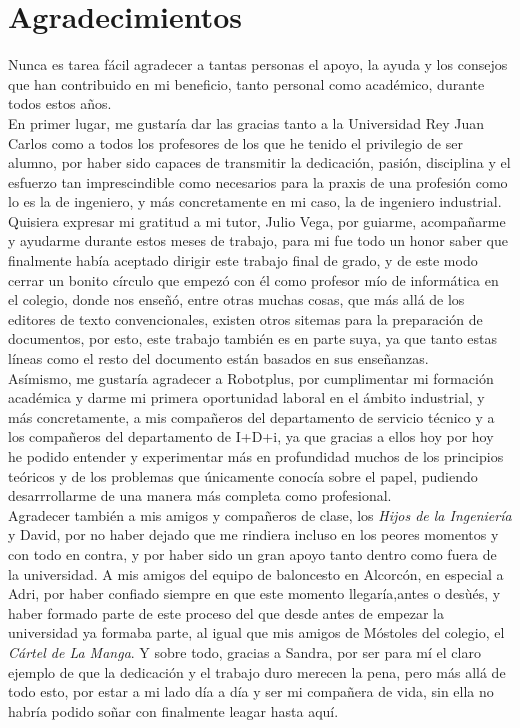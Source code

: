 \cleardoublepage

\chapter*{Agradecimientos}

Nunca es tarea fácil agradecer a tantas personas el apoyo, la ayuda y los consejos que han contribuido en mi beneficio, tanto personal como académico, durante todos estos años.\\

En primer lugar, me gustaría dar las gracias tanto a la Universidad Rey Juan Carlos como a todos los profesores de los que he tenido el privilegio de ser alumno, por haber sido capaces de transmitir la dedicación, pasión, disciplina y el esfuerzo tan imprescindible como necesarios para la praxis de una profesión como lo es la de ingeniero, y más concretamente en mi caso, la de ingeniero industrial. \\
Quisiera expresar mi gratitud a mi tutor, Julio Vega, por guiarme, acompañarme y ayudarme durante estos meses de trabajo, para mi fue todo un honor saber que finalmente había aceptado dirigir este trabajo final de grado, y de este modo cerrar un bonito círculo que empezó con él como profesor mío de informática en el colegio, donde nos enseñó, entre otras muchas cosas, que más allá de los editores de texto convencionales, existen otros sitemas para la preparación de documentos, por esto, este trabajo también es en parte suya, ya que tanto estas líneas como el resto del documento están basados en sus enseñanzas.\\

Asímismo, me gustaría agradecer a Robotplus, por cumplimentar mi formación académica y darme mi primera oportunidad laboral en el ámbito industrial, y más concretamente, a mis compañeros del departamento de servicio técnico y a los compañeros del departamento de I+D+i, ya que gracias a ellos hoy por hoy he podido entender y experimentar más en profundidad muchos de los principios teóricos y de los problemas que únicamente conocía sobre el papel, pudiendo desarrrollarme de una manera más completa como profesional.\\

 Agradecer también a mis amigos y compañeros de clase, los \textit{Hijos de la Ingeniería} y David, por no haber dejado que me rindiera incluso en los peores momentos y con todo en contra, y por haber sido un gran apoyo tanto dentro como fuera de la universidad.
 A mis amigos del equipo de baloncesto en Alcorcón, en especial a Adri, por haber confiado siempre en que este momento llegaría,antes o desùés, y haber formado parte de este proceso del que desde antes de empezar la universidad ya formaba parte, al igual que mis amigos de Móstoles del colegio, el \textit{Cártel de La Manga}. Y sobre todo, gracias a Sandra, por ser para mí el claro ejemplo de que la dedicación y el trabajo duro merecen la pena, pero más allá de todo esto, por estar a mi lado día a día y ser mi compañera de vida, sin ella no habría podido soñar con finalmente leagar hasta aquí.\\

